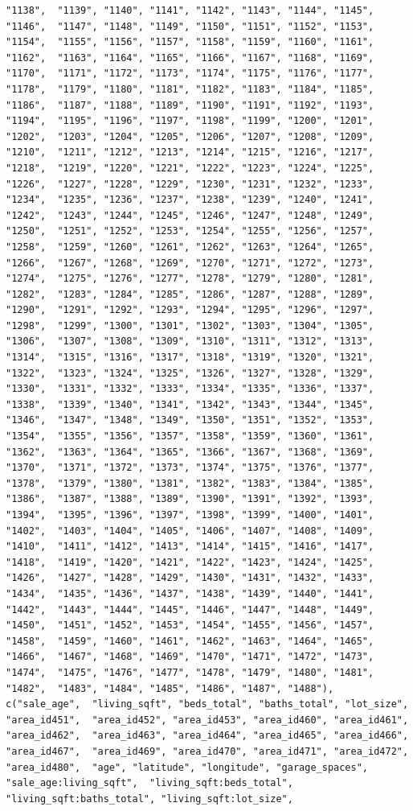 \documentclass[
]{article}
\begin{document}
\begin{verbatim}
"1138",  "1139", "1140", "1141", "1142", "1143", "1144", "1145", "1146",  "1147", "1148", "1149", "1150", "1151", "1152", "1153", "1154",  "1155", "1156", "1157", "1158", "1159", "1160", "1161", "1162",  "1163", "1164", "1165", "1166", "1167", "1168", "1169", "1170",  "1171", "1172", "1173", "1174", "1175", "1176", "1177", "1178",  "1179", "1180", "1181", "1182", "1183", "1184", "1185", "1186",  "1187", "1188", "1189", "1190", "1191", "1192", "1193", "1194",  "1195", "1196", "1197", "1198", "1199", "1200", "1201", "1202",  "1203", "1204", "1205", "1206", "1207", "1208", "1209", "1210",  "1211", "1212", "1213", "1214", "1215", "1216", "1217", "1218",  "1219", "1220", "1221", "1222", "1223", "1224", "1225", "1226",  "1227", "1228", "1229", "1230", "1231", "1232", "1233", "1234",  "1235", "1236", "1237", "1238", "1239", "1240", "1241", "1242",  "1243", "1244", "1245", "1246", "1247", "1248", "1249", "1250",  "1251", "1252", "1253", "1254", "1255", "1256", "1257", "1258",  "1259", "1260", "1261", "1262", "1263", "1264", "1265", "1266",  "1267", "1268", "1269", "1270", "1271", "1272", "1273", "1274",  "1275", "1276", "1277", "1278", "1279", "1280", "1281", "1282",  "1283", "1284", "1285", "1286", "1287", "1288", "1289", "1290",  "1291", "1292", "1293", "1294", "1295", "1296", "1297", "1298",  "1299", "1300", "1301", "1302", "1303", "1304", "1305", "1306",  "1307", "1308", "1309", "1310", "1311", "1312", "1313", "1314",  "1315", "1316", "1317", "1318", "1319", "1320", "1321", "1322",  "1323", "1324", "1325", "1326", "1327", "1328", "1329", "1330",  "1331", "1332", "1333", "1334", "1335", "1336", "1337", "1338",  "1339", "1340", "1341", "1342", "1343", "1344", "1345", "1346",  "1347", "1348", "1349", "1350", "1351", "1352", "1353", "1354",  "1355", "1356", "1357", "1358", "1359", "1360", "1361", "1362",  "1363", "1364", "1365", "1366", "1367", "1368", "1369", "1370",  "1371", "1372", "1373", "1374", "1375", "1376", "1377", "1378",  "1379", "1380", "1381", "1382", "1383", "1384", "1385", "1386",  "1387", "1388", "1389", "1390", "1391", "1392", "1393", "1394",  "1395", "1396", "1397", "1398", "1399", "1400", "1401", "1402",  "1403", "1404", "1405", "1406", "1407", "1408", "1409", "1410",  "1411", "1412", "1413", "1414", "1415", "1416", "1417", "1418",  "1419", "1420", "1421", "1422", "1423", "1424", "1425", "1426",  "1427", "1428", "1429", "1430", "1431", "1432", "1433", "1434",  "1435", "1436", "1437", "1438", "1439", "1440", "1441", "1442",  "1443", "1444", "1445", "1446", "1447", "1448", "1449", "1450",  "1451", "1452", "1453", "1454", "1455", "1456", "1457", "1458",  "1459", "1460", "1461", "1462", "1463", "1464", "1465", "1466",  "1467", "1468", "1469", "1470", "1471", "1472", "1473", "1474",  "1475", "1476", "1477", "1478", "1479", "1480", "1481", "1482",  "1483", "1484", "1485", "1486", "1487", "1488"), c("sale_age",  "living_sqft", "beds_total", "baths_total", "lot_size", "area_id451",  "area_id452", "area_id453", "area_id460", "area_id461", "area_id462",  "area_id463", "area_id464", "area_id465", "area_id466", "area_id467",  "area_id469", "area_id470", "area_id471", "area_id472", "area_id480",  "age", "latitude", "longitude", "garage_spaces", "sale_age:living_sqft",  "living_sqft:beds_total", "living_sqft:baths_total", "living_sqft:lot_size",  
\end{verbatim}
\end{document}
